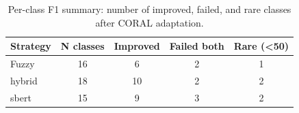 \begin{table}[htbp]
\caption{Per-class F1 summary: number of improved, failed, and rare classes after CORAL adaptation.}
\label{tab:perclass_summary}
\begin{tabular}{lcccc}
\toprule
Strategy & N classes & Improved & Failed both & Rare (<50) \\
\midrule
Fuzzy & 16 & 6 & 2 & 1 \\
hybrid & 18 & 10 & 2 & 2 \\
sbert & 15 & 9 & 3 & 2 \\
\bottomrule
\end{tabular}
\end{table}
